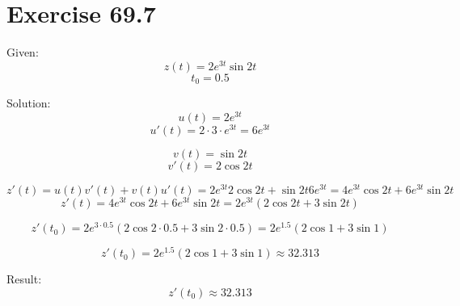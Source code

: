 \documentclass[a4paper, 10pt]{scrartcl}
\begin{document}
\section{Exercise 69.7}

Given:
\[z(t) = 2e^{3t}\sin{2t}\]
\[t_{0} = 0.5\]

Solution:
\[u(t) = 2e^{3t}\]
\[u'(t) = 2\cdot3\cdot e^{3t} = 6e^{3t}\]

\[v(t) = \sin{2t}\]
\[v'(t) = 2\cos{2t}\]

\[z'(t) = u(t)v'(t) + v(t)u'(t) = 2e^{3t}2\cos{2t} + \sin{2t}6e^{3t} =
          4e^{3t}\cos{2t} + 6e^{3t}\sin{2t}\]
\[z'(t) = 4e^{3t}\cos{2t} + 6e^{3t}\sin{2t} = 2e^{3t}(2\cos{2t} + 3\sin{2t})\]

\[z'(t_{0}) = 2e^{3\cdot 0.5}(2\cos{2\cdot 0.5} + 3\sin{2\cdot 0.5}) =
              2e^{1.5}(2\cos{1} + 3\sin{1})\]

\[z'(t_{0}) = 2e^{1.5}(2\cos{1} + 3\sin{1}) \approx 32.313\]


Result:
\[z'(t_{0}) \approx 32.313\]
\end{document}
